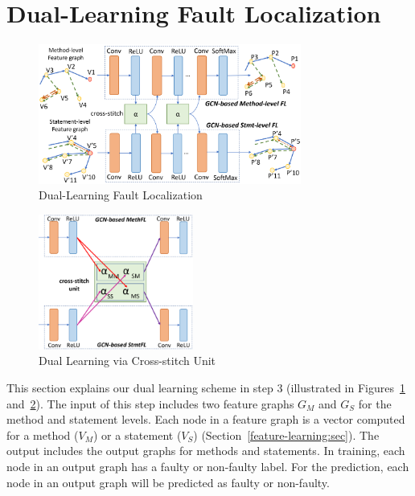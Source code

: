 \section{Dual-Learning Fault Localization}
\label{sec:dual-learning}

\begin{figure}[t]
	\centering
	\includegraphics[width=3.4in]{graphs/dual-learning.png}
        \vspace{-18pt}
	\caption{Dual-Learning Fault Localization}
	\label{dual-learning}
\end{figure}

\begin{figure}[t]
	\centering
	\includegraphics[width=2in]{graphs/cross-stitch.png}
        \vspace{-6pt}
	\caption{Dual Learning via Cross-stitch Unit}
	\label{cross-stitch}
\end{figure}

This section explains our dual learning scheme in step 3 (illustrated
in Figures~\ref{dual-learning} and~\ref{cross-stitch}). The input of
this step includes two feature graphs $G_M$ and $G_S$ for the method
and statement levels. Each node in a feature graph is a vector
computed for a method ($V_M$) or a statement ($V_S$)
(Section~\ref{feature-learning:sec}). The output includes the output
graphs for methods and statements. In training, each node in an output
graph has a faulty or non-faulty label. For the prediction, each node
in an output graph will be predicted as faulty or non-faulty.


